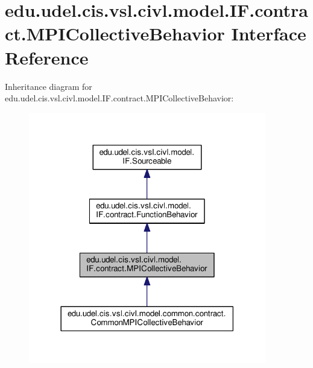 \hypertarget{interfaceedu_1_1udel_1_1cis_1_1vsl_1_1civl_1_1model_1_1IF_1_1contract_1_1MPICollectiveBehavior}{}\section{edu.\+udel.\+cis.\+vsl.\+civl.\+model.\+I\+F.\+contract.\+M\+P\+I\+Collective\+Behavior Interface Reference}
\label{interfaceedu_1_1udel_1_1cis_1_1vsl_1_1civl_1_1model_1_1IF_1_1contract_1_1MPICollectiveBehavior}


Inheritance diagram for edu.\+udel.\+cis.\+vsl.\+civl.\+model.\+I\+F.\+contract.\+M\+P\+I\+Collective\+Behavior\+:
\nopagebreak
\begin{figure}[H]
\begin{center}
\leavevmode
\includegraphics[width=294pt]{interfaceedu_1_1udel_1_1cis_1_1vsl_1_1civl_1_1model_1_1IF_1_1contract_1_1MPICollectiveBehavior__inherit__graph}
\end{center}
\end{figure}


